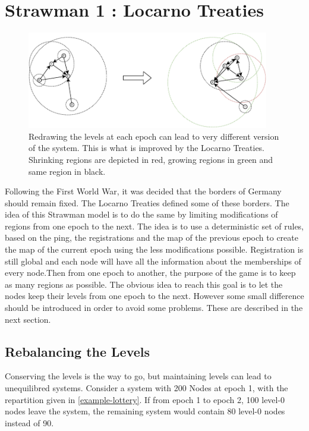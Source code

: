 \documentclass[a4paper,11pt,oneside]{report}
\begin{document}
\section{Strawman 1 : Locarno Treaties} \label{Locarno}

\begin{figure}[!h] 
\centering
\includegraphics[width=300pt]{figures/LocarnoTreaties-Redrawing}
\caption{Redrawing the levels at each epoch can lead to very different version
    of the system. This is what is improved by the Locarno Treaties. Shrinking
    regions are depicted in red, growing regions in green and same region in
    black.} \label{fig:LocarnoTreaties-Redrawing}
\end{figure}

Following the First World War, it was decided that the borders of Germany
should remain fixed. The Locarno Treaties defined some of these borders. The
idea of this Strawman model is to do the same by limiting modifications of
regions from one epoch to the next. The idea is to use a deterministic set of
rules, based on the ping, the registrations and the map of the previous epoch
to create the map of the current epoch using the less modifications possible.
Registration is still global and each node will have all the information about
the memberships of every node.Then from one epoch to another, the purpose of
the game is to keep as many regions as possible. The obvious idea to reach this
goal is to let the nodes keep their levels from one epoch to the next.  However
some small difference should be introduced in order to avoid some problems.
These are described in the next section.

\subsection{Rebalancing the Levels} \label{rebalancing}
Conserving the levels is the way to go, but maintaining levels can lead to
unequilibred systems. Consider a system with 200 Nodes at epoch 1, with the
repartition given in \autoref{example-lottery}. If from epoch 1 to epoch 2,
100 level-0 nodes leave the system, the remaining system would contain 80
level-0 nodes instead of 90. 
\end{document}
